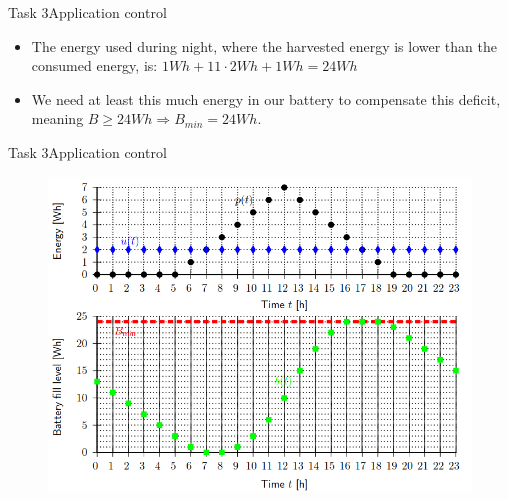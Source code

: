 \begin{frame}{Task 3}{Application control}
    \begin{solutionnoinc}
        \begin{itemize}
            \item The energy used during night, where the harvested energy is \alert{lower} than the consumed energy, is: $1Wh + 11 \cdot 2Wh + 1Wh = 24Wh$
            \item We need at least this much energy in our battery to compensate this deficit, meaning $B \geq 24Wh \Rightarrow B_{min} = 24Wh$.
        \end{itemize}
    \end{solutionnoinc}
\end{frame}
\begin{frame}{Task 3}{Application control}
\begin{figure}
    \centering
    \includegraphics[scale=0.4]{figures/energyUsage.PNG}
\end{figure}
\end{frame}
